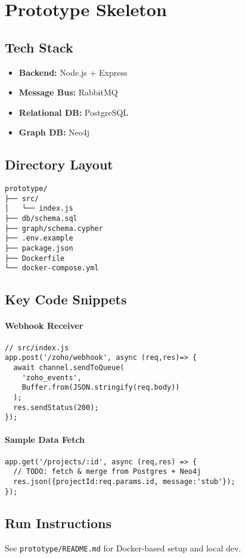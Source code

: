 \section{Prototype Skeleton}

\subsection{Tech Stack}
\begin{itemize}
  \item \textbf{Backend:} Node.js + Express
  \item \textbf{Message Bus:} RabbitMQ
  \item \textbf{Relational DB:} PostgreSQL
  \item \textbf{Graph DB:} Neo4j
\end{itemize}

\subsection{Directory Layout}
\begin{verbatim}
prototype/
├── src/
│   └── index.js
├── db/schema.sql
├── graph/schema.cypher
├── .env.example
├── package.json
├── Dockerfile
└── docker-compose.yml
\end{verbatim}

\subsection{Key Code Snippets}
\paragraph{Webhook Receiver}
\begin{verbatim}
// src/index.js
app.post('/zoho/webhook', async (req,res)=> {
  await channel.sendToQueue(
    'zoho_events',
    Buffer.from(JSON.stringify(req.body))
  );
  res.sendStatus(200);
});
\end{verbatim}

\paragraph{Sample Data Fetch}
\begin{verbatim}
app.get('/projects/:id', async (req,res) => {
  // TODO: fetch & merge from Postgres + Neo4j
  res.json({projectId:req.params.id, message:'stub'});
});
\end{verbatim}

\subsection{Run Instructions}
See \texttt{prototype/README.md} for Docker-based setup and local dev. 